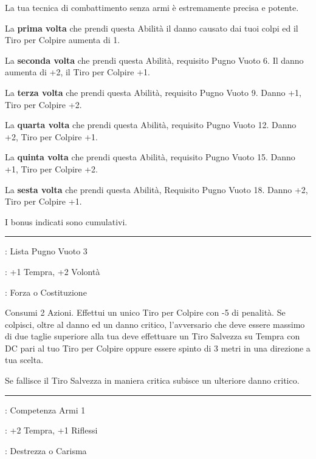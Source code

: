 \begin{multicols}{2}
La tua tecnica di combattimento senza armi è estremamente precisa e potente.

La \textbf{prima volta} che prendi questa Abilità il danno causato dai tuoi colpi ed il Tiro per Colpire aumenta di 1.

La \textbf{seconda volta} che prendi questa Abilità, requisito Pugno Vuoto 6. Il danno aumenta di +2, il Tiro per Colpire +1.

La \textbf{terza volta} che prendi questa Abilità, requisito Pugno Vuoto 9. Danno +1, Tiro per Colpire +2.

La \textbf{quarta volta} che prendi questa Abilità, requisito Pugno Vuoto 12. Danno +2, Tiro per Colpire +1.

La \textbf{quinta volta} che prendi questa Abilità, requisito Pugno Vuoto 15. Danno +1, Tiro per Colpire +2.

La \textbf{sesta volta} che prendi questa Abilità, Requisito Pugno Vuoto 18. Danno +2, Tiro per Colpire +1.

I bonus indicati sono cumulativi.

\smallskip\noindent\rule{\linewidth}{2pt} \hypertarget{Pugno Potente}{}\medskip{}
\noindent
\begin{description}[noitemsep, topsep=0pt, parsep=0pt, partopsep=0pt, leftmargin=0cm, labelwidth=2.5cm]
    \item[\textbf{Requisito}]: Lista Pugno Vuoto 3
    \item[\textbf{Tiri Salvezza}]: +1 Tempra, +2 Volontà
    \item[\textbf{Caratteristica}]: Forza o Costituzione
\end{description}

Consumi 2 Azioni. Effettui un unico Tiro per Colpire con -5 di penalità.
Se colpisci, oltre al danno ed un danno critico, l'avversario che deve essere massimo di due taglie superiore alla tua deve effettuare un Tiro Salvezza su Tempra con DC pari al tuo Tiro per Colpire oppure essere spinto di 3 metri in una direzione a tua scelta.

Se fallisce il Tiro Salvezza in maniera critica subisce un ulteriore danno critico.

\smallskip\noindent\rule{\linewidth}{2pt} \hypertarget{Questo è il mio pugnale}{}\medskip{}
\noindent
\begin{description}[noitemsep, topsep=0pt, parsep=0pt, partopsep=0pt, leftmargin=0cm, labelwidth=2.5cm]
    \item[\textbf{Requisito}]: Competenza Armi 1
    \item[\textbf{Tiri Salvezza}]: +2 Tempra, +1 Riflessi
    \item[\textbf{Caratteristica}]: Destrezza o Carisma
\end{description}


\end{multicols}
